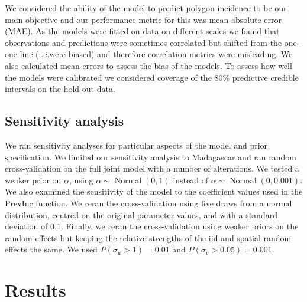 \documentclass{statsoc}
\begin{document}
We considered the ability of the model to predict polygon incidence to be our main objective and our performance metric for this was mean absolute error (MAE).
As the models were fitted on data on different scales we found that observations and predictions were sometimes correlated but shifted from the one-one line (i.e.\thinspace were biased) and therefore correlation metrics were misleading.
We also calculated mean errors to assess the bias of the models.
To assess how well the models were calibrated we considered coverage of the 80\% predictive credible intervals on the hold-out data.


\subsection*{Sensitivity analysis}

We ran sensitivity analyses for particular aspects of the model and prior specification.
We limited our sensitivity analysis to Madagascar and ran random cross-validation on the full joint model with a number of alterations.
We tested a weaker prior on $\alpha$, using $\alpha \sim \operatorname{Normal}(0, 1)$ instead of $\alpha \sim \operatorname{Normal}(0, 0.001)$.
We also examined the sensitivity of the model to the coefficient values used in the PrevInc function. 
We reran the cross-validation using five draws from a normal distribution, centred on the original parameter values, and with a standard deviation of 0.1.
Finally, we reran the cross-validation using weaker priors on the random effects but keeping the relative strengths of the iid and spatial random effects the same.
We used $P(\sigma_u > 1) = 0.01$ and $P(\sigma_v > 0.05) = 0.001$.




\section*{Results}

\end{document}
